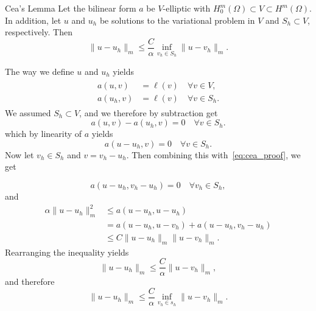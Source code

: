 \begin{lem}{Cea's Lemma\label{lem:cea}}
    Let the bilinear form $a$ be $V$-elliptic with $H_0^m(\Omega)\subset V \subset H^m(\Omega)$. In addition, let $u$ and $u_h$ be solutions to the variational problem in $V$ and $S_h\subset V$, respectively. Then
    \begin{equation}
        \label{eq:cea}
        \|u-u_h\|_m\leq \frac{C}{\alpha}\inf_{v_h\in S_h} \|u-v_h\|_m.
    \end{equation}
    
\end{lem}
\begin{bev}
    The way we define $u$ and $u_h$ yields
    \begin{align}
    \begin{split}
        a(u,v)&= \ell(v) \quad \forall v\in V,\\
        a(u_h,v)&=\ell(v) \quad \forall v\in S_h.
    \end{split}
    \end{align}
    We assumed $S_h\subset V$, and we therefore by subtraction get
    \begin{equation}
        a(u,v)-a(u_h,v)=0 \quad \forall v\in S_h.
    \end{equation}
    which by linearity of $a$ yields
    \begin{equation}
        \label{eq:cea_proof}
        a(u-u_h,v)=0 \quad \forall v\in S_h.
    \end{equation}
    Now let $v_h\in S_h$ and $v=v_h-u_h$. Then combining this with~\eqref{eq:cea_proof}, we get  

    \begin{equation}
        a(u-u_h,v_h-u_h)=0 \quad \forall v_h\in S_h,
    \end{equation}
    and
    \begin{align*}
        \alpha\|u-u_h\|_m^2&\leq a(u-u_h,u-u_h)\\
        &=a(u-u_h,u-v_h)+a(u-u_h,v_h-u_h)\\ 
        &\leq C\|u-u_h\|_m\|u-v_h\|_m.
    \end{align*}
    Rearranging the inequality yields 
    \begin{equation}
        \|u-u_h\|_m\leq \frac{C}{\alpha} \|u-v_h\|_m,
    \end{equation} 
    and therefore
    \begin{equation}
        \|u-u_h\|_m\leq \frac{C}{\alpha}\inf_{v_h\in s_h} \|u-v_h\|_m.
    \end{equation}
\end{bev}